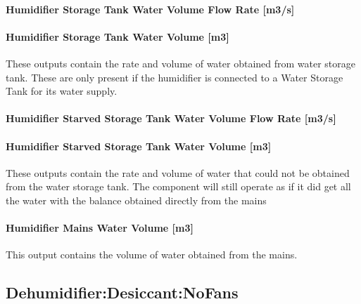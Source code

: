 \paragraph{Humidifier Storage Tank Water Volume Flow Rate {[}m3/s{]}}\label{humidifier-storage-tank-water-volume-flow-rate-m3s-1}

\paragraph{Humidifier Storage Tank Water Volume {[}m3{]}}\label{humidifier-storage-tank-water-volume-m3-1}

These outputs contain the rate and volume of water obtained from water storage tank. These are only present if the humidifier is connected to a Water Storage Tank for its water supply.

\paragraph{Humidifier Starved Storage Tank Water Volume Flow Rate {[}m3/s{]}}\label{humidifier-starved-storage-tank-water-volume-flow-rate-m3s-1}

\paragraph{Humidifier Starved Storage Tank Water Volume {[}m3{]}}\label{humidifier-starved-storage-tank-water-volume-m3-1}

These outputs contain the rate and volume of water that could not be obtained from the water storage tank. The component will still operate as if it did get all the water with the balance obtained directly from the mains

\paragraph{Humidifier Mains Water Volume {[}m3{]}}\label{humidifier-mains-water-volume-m3-1}

This output contains the volume of water obtained from the mains.

\subsection{Dehumidifier:Desiccant:NoFans}\label{dehumidifierdesiccantnofans}

